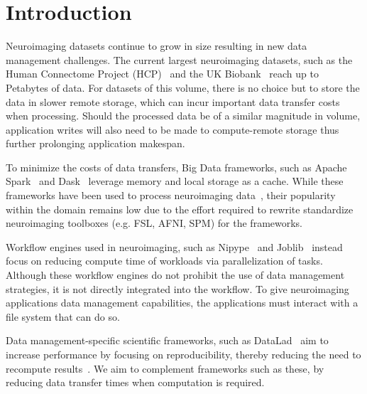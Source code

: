   \section{Introduction}\label{sec:sea_neuro:introduction}
    
    Neuroimaging datasets continue to grow in size resulting in new data
    management challenges. The current largest neuroimaging datasets, such as
    the Human Connectome Project (HCP)~\cite{HCP} and the UK
    Biobank~\cite{ukbiobank} reach up to Petabytes of data. For datasets of this
    volume, there is no choice but to store the data in slower remote storage,
    which can incur important data transfer costs when processing. Should the
    processed data be of a similar magnitude in volume, application writes will
    also need to be made to compute-remote storage thus further prolonging
    application makespan. 

    To minimize the costs of data transfers, Big Data frameworks, such as Apache
    Spark~\cite{zaharia2016apache} and Dask~\cite{rocklin2015dask} leverage
    memory and local storage as a cache. While these frameworks have been used
    to process neuroimaging data~\cite{rokem2021pan,thunder,boubela2016big},
    their popularity within the domain remains low due to the effort required to
    rewrite standardize neuroimaging toolboxes (e.g. FSL, AFNI, SPM) for the
    frameworks. 
    
    Workflow engines used in neuroimaging, such as Nipype~\cite{nipype} and
    Joblib~\cite{joblib} instead focus on reducing compute time of workloads via
    parallelization of tasks.
    Although these workflow engines do not prohibit the use of data management
    strategies, it is not directly integrated into the workflow. To give
    neuroimaging applications data management capabilities, the applications
    must interact with a file system that can do so.

    Data management-specific scientific frameworks, such as
    DataLad~\cite{halchenko2021datalad} aim to increase performance by focusing
    on reproducibility, thereby reducing the need to recompute
    results~\cite{wagner2021fairly}. We aim to complement frameworks such as
    these, by reducing data transfer times when computation is required.

